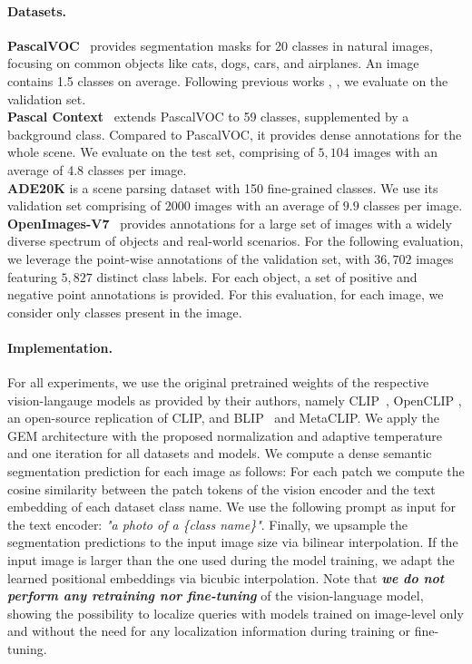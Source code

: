 \documentclass[10pt,twocolumn,letterpaper]{article}
\begin{document}
\paragraph{Datasets.}
\textbf{PascalVOC}~\citep{everingham2010pascal} provides segmentation masks for 20 classes in natural images, focusing on common objects like cats, dogs, cars, and airplanes.
An image contains 1.5 classes on average.
Following previous works \citep{li2023clipsurgery}, \citep{zhou2022extract}, we evaluate on the validation set.
\\
\textbf{Pascal Context}~\citep{mottaghi2014role} extends PascalVOC to 59 classes, supplemented by a background class. Compared to PascalVOC, it provides dense annotations for the whole scene. We evaluate on the test set, comprising of $5,104$ images with an average of 4.8 classes per image.
\\
\textbf{ADE20K} \citep{zhou2019sADE} is a scene parsing dataset with 150 fine-grained classes. We use its validation set comprising of $2000$ images with an average of $9.9$ classes per image.
\\
\textbf{OpenImages-V7}~\citep{benenson2022colouring} provides annotations for a large set of images with a widely diverse spectrum of objects and real-world scenarios.
For the following evaluation, we leverage the point-wise annotations of the validation set, with $36,702$ images featuring $5,827$ distinct class labels. 
For each object, a set of positive and negative point annotations is provided. 
For this evaluation, for each image, we consider only classes present in the image. 
\vspace{-5mm}
\paragraph{Implementation.}
For all experiments, we use the original pretrained weights of the respective vision-langauge models as provided by their authors, namely CLIP~\citep{radford2021learning}, OpenCLIP \citep{cherti2023reproducible}, an open-source replication of CLIP, and BLIP~\citep{li2022blip} and MetaCLIP\citep{xu2023demystifying}.
We apply the GEM architecture with the proposed normalization and adaptive temperature and one iteration for all datasets and models. 
We compute a dense semantic segmentation prediction for each image as follows: For each patch we compute the cosine similarity between the patch tokens of the vision encoder and the text embedding of each dataset class name.
We use the following prompt as input for the text encoder: \textit{"a photo of a \{class name\}"}. 
Finally, we upsample the segmentation predictions to the input image size via bilinear interpolation.
If the input image is larger than the one used during the model training, we adapt the learned positional embeddings via bicubic interpolation.
Note that \emph{\textbf{we do not perform any retraining nor fine-tuning}} of the vision-language model, showing the possibility to localize queries with models trained on image-level only and without the need for any localization information during training or fine-tuning.
\end{document}
